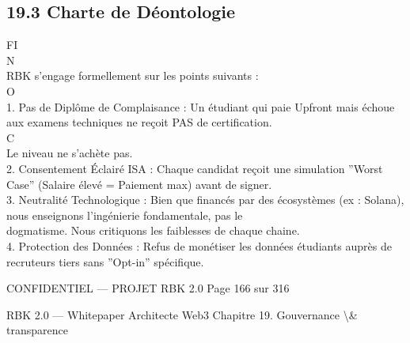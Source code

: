 \subsection{19.3 Charte de Déontologie}
FI\\
N\\
RBK s’engage formellement sur les points suivants :\\
O\\
\vspace{0.5em}
1. Pas de Diplôme de Complaisance : Un étudiant qui paie Upfront mais échoue aux examens techniques ne reçoit PAS de certification.\\
C\\
\vspace{0.5em}
\vspace{0.5em}
Le niveau ne s’achète pas.\\
\vspace{0.5em}
2. Consentement Éclairé ISA : Chaque candidat reçoit une simulation ”Worst Case” (Salaire élevé = Paiement max) avant de signer.\\
\vspace{0.5em}
3. Neutralité Technologique : Bien que financés par des écosystèmes (ex : Solana), nous enseignons l’ingénierie fondamentale, pas le\\
dogmatisme. Nous critiquons les faiblesses de chaque chaine.\\
\vspace{0.5em}
4. Protection des Données : Refus de monétiser les données étudiants auprès de recruteurs tiers sans ”Opt-in” spécifique.\\
\vspace{0.5em}
\vspace{0.5em}
\begin{confidential}CONFIDENTIEL — PROJET RBK 2.0                              Page 166 sur 316\end{confidential}
RBK 2.0 — Whitepaper Architecte Web3                                                                              Chapitre 19. Gouvernance \textbackslash{}& transparence\\
\vspace{0.5em}
\vspace{0.5em}
\vspace{0.5em}
